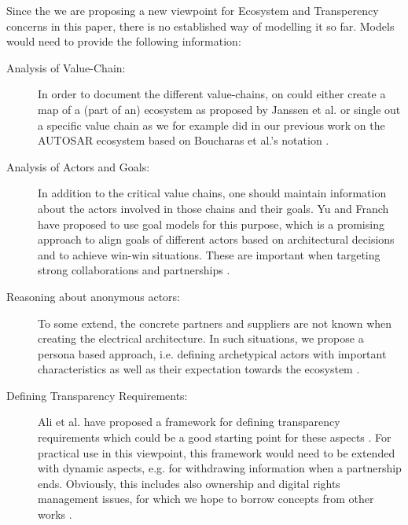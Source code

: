 Since the we are proposing a new viewpoint for Ecosystem and Transperency concerns in this paper, there is no established way of modelling it so far. 
Models would need to provide the following information:
\begin{description}
\item[Analysis of Value-Chain:] In order to document the different value-chains, on could either create a map of a (part of an) ecosystem as proposed by Janssen et al. \cite{Jansen2012b} or single out a specific value chain as we for example did in our previous work on the AUTOSAR ecosystem \cite{Soltani2015a} based on Boucharas et al.'s notation \cite{BJB2009}.
\item[Analysis of Actors and Goals:] In addition to the critical value chains, one should maintain information about the actors involved in those chains and their goals.
Yu and Franch have proposed to use goal models for this purpose, which is a promising approach to align goals of different actors based on architectural decisions and to achieve win-win situations. These are important when targeting strong collaborations and partnerships \cite{Yu,Franch}.
\item[Reasoning about anonymous actors:] To some extend, the concrete partners and suppliers are not known when creating the electrical architecture. 
In such situations, we propose a persona based approach, i.e. defining archetypical actors with important characteristics as well as their expectation towards the ecosystem \cite{Knauss2014c,Hammouda2015}.
\item[Defining Transparency Requirements:] Ali et al. have proposed a framework for defining transparency requirements which could be a good starting point for these aspects \cite{Ali}. For practical use in this viewpoint, this framework would need to be extended with dynamic aspects, e.g. for withdrawing information when a partnership ends. 
Obviously, this includes also ownership and digital rights management issues, for which we hope to borrow concepts from other works \cite{Muller,Averbakh2014}.
\end{description}


